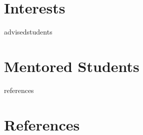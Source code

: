 \documentclass[12pt]{report} %
\begin{document}
\section{Interests}
\interests{}
\fi
\fi



\ifcsname advisedstudents\endcsname%
\section{Mentored Students}
\advisedstudents{}
\fi



\ifcsname references\endcsname%
\section{References}
\fi


\end{document}
